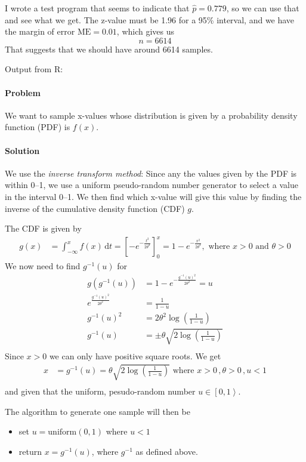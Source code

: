 \documentclass[a4paper,english,12pt]{article}
\begin{document}
I wrote a test program that seems to indicate that $\hat{p} = 0.779$, so we can
use that and see what we get.  The z-value must be 1.96 for a 95\%{} interval,
and we have the margin of error $\text{ME} = 0.01$, which gives us
\[
  n = 6614
\]
That suggests that we should have around 6614 samples.

Output from R:

\paragraph{Problem} We want to sample x-values whose distribution is given by a
probability density function (PDF) is $f(x)$.
\paragraph{Solution} We use the \textit{inverse transform method}: Since any
the values given by the PDF is within 0--1, we use a uniform pseudo-random
number generator to select a value in the interval 0--1. We then find which
x-value will give this value by finding the inverse of the cumulative density
function (CDF) $g$.

The CDF is given by
\begin{align*}
  g(x) & = \int_{-\infty}^{x} f(x)\, \mathrm{d}t 
     = \left[ -e^{-\frac{t^2}{2\theta^2}} \right]_0^{x} = 
     1 - e^{-\frac{x^2}{2\theta^2}}, \text{ where } x>0 \text{ and } \theta > 0
\end{align*}
We now need to find $g^{-1}(u)$ for
\begin{align*}
  g(g^{-1}(u)) &= 1 - e^{-\frac{g^{-1}(u)^2}{2\theta^2}} = u \\
   e^\frac{g^{-1}(u)^2}{2\theta^2}  &= \frac{1}{1 - u} \\
   g^{-1}(u)^2  &= 2\theta^2\log{\left(\frac{1}{1 - u}\right)} \\
   g^{-1}(u)  &= \pm\theta\sqrt{2\log{\left(\frac{1}{1 - u}\right)}} \\
\end{align*}
Since $x > 0$ we can only have positive square roots. We get
\begin{align*}
    x &= g^{-1}(u) = \theta\sqrt{2\log{\left(\frac{1}{1 - u}\right)}}
   \text{ where } x>0\, , \theta>0\, , u<1
   \\
\end{align*}%
and given that the uniform, pesudo-random number $u \in \left[ 0,1 \right>$.

The algorithm to generate one sample will then be
\begin{itemize}
  \item set $u = \mathrm{uniform}(0,1)$ where $u<1$
  \item return $x = g^{-1}(u)$, where $g^{-1}$ as defined above.
\end{itemize}
\end{document}
